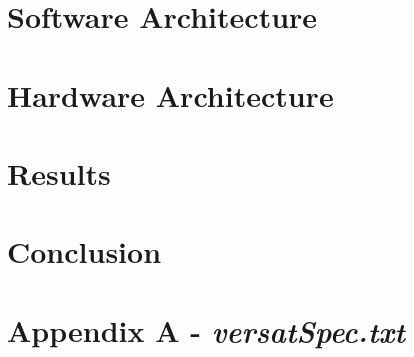 \documentclass[10pt]{esda}
\begin{document}
\section{Software Architecture}
\label{sec:sw}


\cleardoublepage
\section{Hardware Architecture}
\label{sec:hw}


\cleardoublepage
\section{Results}
\label{sec:results}


\cleardoublepage
\section{Conclusion}
\label{sec:conc}


\cleardoublepage
{}




\cleardoublepage

\section*{Appendix A - \textbf{\textit{versatSpec.txt}}}
\appendix

\end{document}
